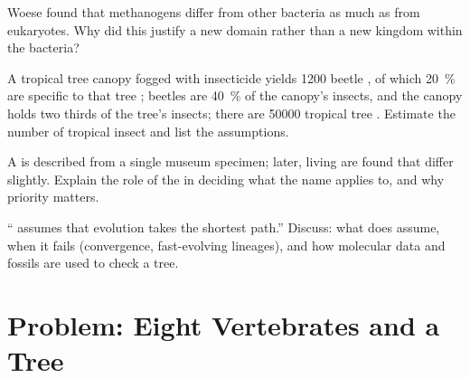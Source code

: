 \begin{exercise}[$\star\star$]\label{exo:b1:classifying-biodiversity:9}
Woese found that methanogens differ from other bacteria as much as
from eukaryotes. Why did this justify a new domain rather than a new
kingdom within the bacteria?
\end{exercise}

\begin{exercise}[$\star\star\star$]\label{exo:b1:classifying-biodiversity:10}
A tropical tree canopy fogged with insecticide yields 1200 beetle
, of which \qty{20}{\%} are specific to that tree ;
beetles are \qty{40}{\%} of the canopy's insects, and the canopy
holds two thirds of the tree's insects; there are \num{50000}
tropical tree . Estimate the number of tropical insect
 and list the assumptions.
\end{exercise}

\begin{exercise}[$\star\star\star$]\label{exo:b1:classifying-biodiversity:11}
A  is described from a single museum specimen; later, living
 are found that differ slightly. Explain the role of the
 in deciding what the name applies to, and why priority
matters.
\end{exercise}

\begin{exercise}[$\star\star\star$]\label{exo:b1:classifying-biodiversity:12}
`` assumes that evolution takes the shortest path.'' Discuss:
what  does assume, when it fails (convergence, fast-evolving
lineages), and how molecular data and fossils are used to check a
tree.
\end{exercise}

\section{Problem: Eight Vertebrates and a Tree}

